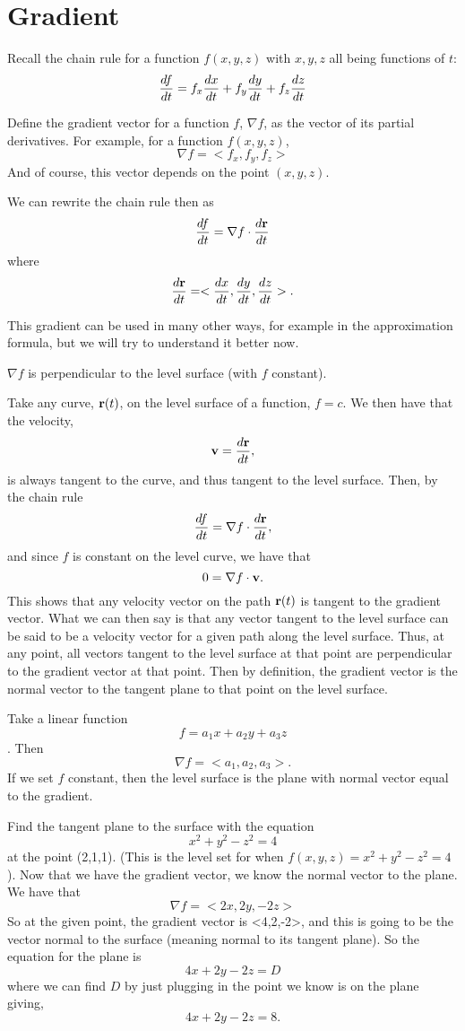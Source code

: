 \section{Gradient}

Recall the chain rule for a function $f(x,y,z)$ with $x,y,z$ all being functions of $t$:
\[ \frac{df}{dt} = f_x \frac{dx}{dt} + f_y \frac{dy}{dt} + f_z \frac{dz}{dt} \] 

\bdf
Define the gradient vector for a function $f$, $\nabla f$, as the vector of its partial derivatives. For example, for a function $f(x,y,z)$,
\[ \nabla f = <f_x,f_y,f_z> \]
And of course, this vector depends on the point $(x,y,z)$. 
\edf

We can rewrite the chain rule then as
\[ \frac{df}{dt} = \nabla f \cdot \frac{d\boldsymbol{\mathbf{r}}}{dt} \]
where
\[ \frac{d\boldsymbol{\mathbf{r}}}{dt} = <\frac{dx}{dt},\frac{dy}{dt},\frac{dz}{dt}>. \]

This gradient can be used in many other ways, for example in the approximation formula, but we will try to understand it better now.

\btm
$\nabla f$ is perpendicular to the level surface (with $f$ constant).

\bpf
Take any curve, $\boldsymbol{\mathbf{r}}(t)$, on the level surface of a function, $f = c$. We then have that the velocity,
\[ \boldsymbol{\mathbf{v}} = \frac{d\boldsymbol{\mathbf{r}}}{dt}, \]
is always tangent to the curve, and thus tangent to the level surface. Then, by the chain rule
\[ \frac{df}{dt} = \nabla f \cdot \frac{d\boldsymbol{\mathbf{r}}}{dt}, \] 
and since $f$ is constant on the level curve, we have that
\[ 0 = \nabla f \cdot \boldsymbol{\mathbf{v}}. \]
This shows that any velocity vector on the path $\boldsymbol{\mathbf{r}}(t)$ is tangent to the gradient vector. What we can then say is that any vector tangent to the level surface can be said to be a velocity vector for a given path along the level surface. Thus, at any point, all vectors tangent to the level surface at that point are perpendicular to the gradient vector at that point. Then by definition, the gradient vector is the normal vector to the tangent plane to that point on the level surface. 
\epf
\etm

\bex
Take a linear function
\[ f = a_1x+a_2y+a_3z \].
Then 
\[ \nabla f = <a_1,a_2,a_3>. \]
If we set $f$ constant, then the level surface is the plane with normal vector equal to the gradient. 
\eex

\bex
Find the tangent plane to the surface with the equation
\[ x^2 + y^2 -z^2 = 4 \]
at the point (2,1,1). (This is the level set for when $f(x,y,z)=x^2+y^2-z^2=4$). Now that we have the gradient vector, we know the normal vector to the plane. We have that 
\[ \nabla f = <2x,2y,-2z> \]
So at the given point, the gradient vector is <4,2,-2>, and this is going to be the vector normal to the surface (meaning normal to its tangent plane). So the equation for the plane is 
\[ 4x+2y-2z = D \]
where we can find $D$ by just plugging in the point we know is on the plane giving, 
\[ 4x+2y-2z = 8. \]

